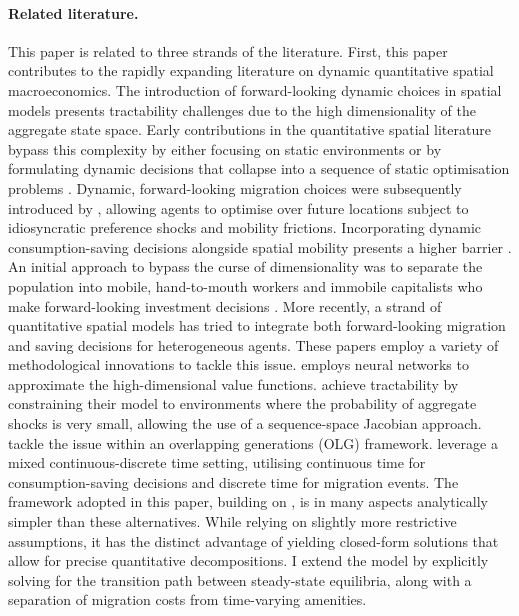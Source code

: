\documentclass[12pt, a4paper]{article}
\begin{document}
\paragraph{Related literature.} This paper is related to three strands of the literature. First, this paper contributes to the rapidly expanding literature on dynamic quantitative spatial macroeconomics. The introduction of forward-looking dynamic choices in spatial models presents tractability challenges due to the high dimensionality of the aggregate state space. Early contributions in the quantitative spatial literature bypass this complexity by either focusing on static environments or by formulating dynamic decisions that collapse into a sequence of static optimisation problems \citep{desmet_geography_2018}. Dynamic, forward-looking migration choices were subsequently introduced by \cite{caliendo_trade_2019}, allowing agents to optimise over future locations subject to idiosyncratic preference shocks and mobility frictions. Incorporating dynamic consumption-saving decisions alongside spatial mobility presents a higher barrier \citep{desmet_spatial_2025}. An initial approach to bypass the curse of dimensionality was to separate the population into mobile, hand-to-mouth workers and immobile capitalists who make forward-looking investment decisions \citep{kleinman_dynamic_2023}. More recently, a strand of quantitative spatial models has tried to integrate both forward-looking migration and saving decisions for heterogeneous agents. These papers employ a variety of methodological innovations to tackle this issue. \cite{sun_wealth_2025} employs neural networks to approximate the high-dimensional value functions. \cite{donald_optimal_2025} achieve tractability by constraining their model to environments where the probability of aggregate shocks is very small, allowing the use of a sequence-space Jacobian approach. \cite{giannone_unpacking_2023} tackle the issue within an overlapping generations (OLG) framework. \cite{greaney_dynamic_2025} leverage a mixed continuous-discrete time setting, utilising continuous time for consumption-saving decisions and discrete time for migration events. The framework adopted in this paper, building on \cite{dvorkin_geography_2025}, is in many aspects analytically simpler than these alternatives. While relying on slightly more restrictive assumptions, it has the distinct advantage of yielding closed-form solutions that allow for precise quantitative decompositions. I extend the \cite{dvorkin_geography_2025} model by explicitly solving for the transition path between steady-state equilibria, along with a separation of migration costs from time-varying amenities. \\
\end{document}
